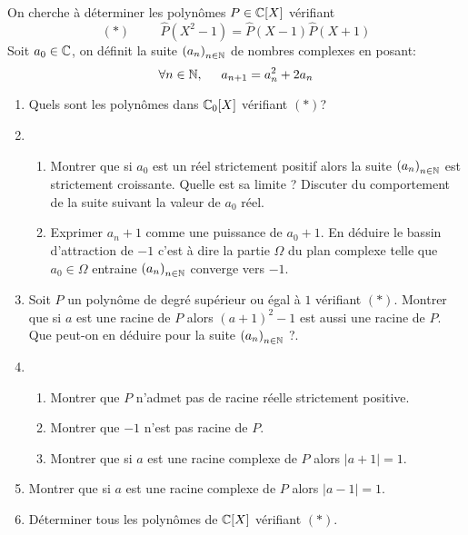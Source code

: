On cherche à déterminer les polynômes $P\in \mathbb{C}[X]$ vérifiant
\begin{displaymath}
 (*)\hspace{1cm}\widehat{P}(X^2-1)=\widehat{P}(X-1)\widehat{P}(X+1)
\end{displaymath}
Soit $a_0\in \mathbb{C}$, on définit la suite $\left( a_n\right) _{n\in \mathbb{N}}$ de nombres complexes en posant:
\begin{displaymath}
 \forall n\in \mathbb{N},\hspace{0.5cm}a_{n+1}=a_n^2+2a_n
\end{displaymath}
\begin{enumerate}
 \item Quels sont les polynômes dans $\mathbb{C}_0[X]$ vérifiant $(*)$?

 \item 
\begin{enumerate}
\item Montrer que si $a_0$ est un réel strictement positif alors la suite $\left( a_n\right) _{n\in \mathbb{N}}$ est strictement croissante. Quelle est sa limite ? Discuter du comportement de la suite suivant la valeur de $a_0$ réel.

\item Exprimer $a_n +1$ comme une puissance de $a_0+1$. En déduire le bassin d'attraction de $-1$ c'est à dire la partie $\Omega$ du plan complexe telle que $a_0\in\Omega$ entraine $\left( a_n\right) _{n\in \mathbb{N}}$ converge vers $-1$.
\end{enumerate}

 \item Soit $P$ un polynôme de degré supérieur ou égal à $1$ vérifiant $(*)$. Montrer que si $a$ est une racine de $P$ alors $(a+1)^2-1$ est aussi une racine de $P$. Que peut-on en déduire pour la suite $\left( a_n\right) _{n\in \mathbb{N}}$ ?.
 
 \item 
\begin{enumerate}
 \item Montrer que $P$ n'admet pas de racine réelle strictement positive.
 \item Montrer que $-1$ n'est pas racine de $P$.
 \item Montrer que si $a$ est une racine complexe de $P$ alors $|a+1|=1$. 
\end{enumerate}
 
\item Montrer que si $a$ est une racine complexe de $P$ alors $|a-1|=1$.

\item Déterminer tous les polynômes de $\mathbb{C}[X]$ vérifiant $(*)$.
\end{enumerate}
